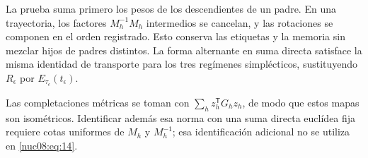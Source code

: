 La prueba suma primero los pesos de los descendientes de un padre. En una trayectoria, los factores \(M_h^{-1}M_h\) intermedios se cancelan, y las rotaciones se componen en el orden registrado. Esto conserva las etiquetas y la memoria sin mezclar hijos de padres distintos. La forma alternante en suma directa satisface la misma identidad de transporte para los tres regímenes simplécticos, sustituyendo \(R_\epsilon\) por \(E_{\tau_\epsilon}(t_\epsilon)\).

Las completaciones métricas se toman con \(\sum_h z_h^\mathsf TG_hz_h\), de modo que estos mapas son isométricos. Identificar además esa norma con una suma directa euclídea fija requiere cotas uniformes de \(M_h\) y \(M_h^{-1}\); esa identificación adicional no se utiliza en \eqref{nuc08:eq:14}.

